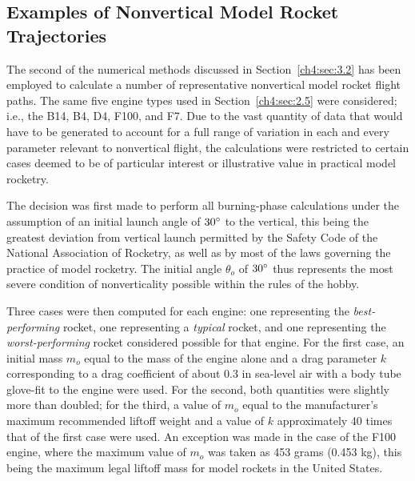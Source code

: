 \subsection{Examples of Nonvertical Model Rocket Trajectories}\label{ch4:sec:3.3}

The second of the numerical methods discussed in Section~\ref{ch4:sec:3.2} has been employed to
calculate a number of representative nonvertical model rocket flight paths. The same five engine
types used in Section~\ref{ch4:sec:2.5} were considered; i.e., the B14, B4, D4, F100, and F7. Due
to the vast quantity of data that would have to be generated to account for a full range of
variation in each and every parameter relevant to nonvertical flight, the calculations were
restricted to certain cases deemed to be of particular interest or illustrative value in practical
model rocketry.

The decision was first made to perform all burning-phase calculations under the assumption of an
initial launch angle of $30^{\circ}$ to the vertical, this being the greatest deviation from vertical
launch permitted by the Safety Code of the National Association of Rocketry, as well as by most of
the laws governing the practice of model rocketry. The initial angle $\theta_o$ of $30^{\circ}$ thus
represents the most severe condition of nonverticality possible within the rules of the hobby.

Three cases were then computed for each engine: one representing the \emph{best-performing}
rocket, one representing a \emph{typical} rocket, and one representing the
\emph{worst-performing} rocket considered possible for that engine. For the first case, an initial
mass $m_o$ equal to the mass of the engine alone and a drag parameter $k$ corresponding to a drag
coefficient of about 0.3 in sea-level air with a body tube glove-fit to the engine were used. For
the second, both quantities were slightly more than doubled; for the third, a value of $m_o$ equal
to the manufacturer's maximum recommended liftoff weight and a value of $k$ approximately 40 times
that of the first case were used. An exception was made in the case of the F100 engine, where the
maximum value of $m_o$ was taken as 453 grams (0.453 kg), this being the maximum legal liftoff mass
for model rockets in the United States.

